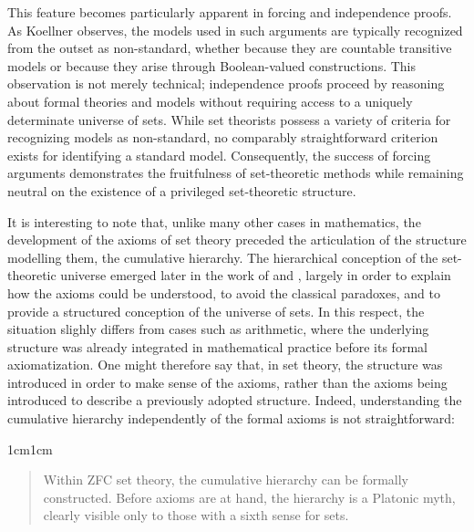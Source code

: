 \documentclass[11pt,a4paper]{article}
\begin{document}
This feature becomes particularly apparent in forcing and independence proofs. As Koellner observes, the models used in such arguments are typically recognized from the outset as non-standard, whether because they are countable transitive models or because they arise through Boolean-valued constructions. This observation is not merely technical; independence proofs proceed by reasoning about formal theories and models without requiring access to a uniquely determinate universe of sets. While set theorists possess a variety of criteria for recognizing models as non-standard, no comparably straightforward criterion exists for identifying a standard model. Consequently, the success of forcing arguments demonstrates the fruitfulness of set-theoretic methods while remaining neutral on the existence of a privileged set-theoretic structure.

It is interesting to note that, unlike many other cases in mathematics, the development of the axioms of set theory preceded the articulation of the structure modelling them, the cumulative hierarchy. The hierarchical conception of the set-theoretic universe emerged later in the work of \textcite{vonNeumann1925} and \textcite{Zermelo1930}, largely in order to explain how the axioms could be understood, to avoid the classical paradoxes, and to provide a structured conception of the universe of sets. In this respect, the situation slighly differs from cases such as arithmetic, where the underlying structure was already integrated in mathematical practice before its formal axiomatization. One might therefore say that, in set theory, the structure was introduced in order to make sense of the axioms, rather than the axioms being introduced to describe a previously adopted structure. Indeed, understanding the cumulative hierarchy independently of the formal axioms is not straightforward:

\begin{adjustwidth}{1cm}{1cm}
\small
\begin{quote}
Within ZFC set theory, the cumulative hierarchy can be formally constructed. Before axioms are at hand, the hierarchy is a Platonic myth, clearly visible only to those with a sixth sense for sets. \textcite[373]{maclane1986mathematics}
\end{quote}
\end{adjustwidth}
\end{document}
